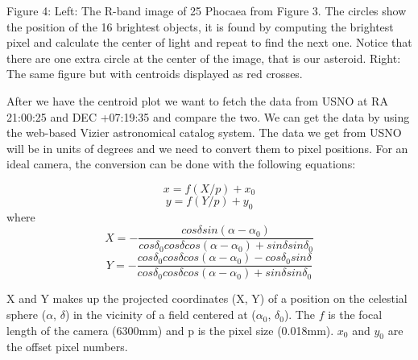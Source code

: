 \documentclass[onecolumn, 12pt, a4paper]{article}
\begin{document}
\newline

Figure 4: Left: The R-band image of 25 Phocaea from Figure 3. The circles show the position of the 16 brightest objects, it is found by computing the brightest pixel and calculate the center of light and repeat to find the next one. Notice that there are one extra circle at the center of the image, that is our asteroid. Right: The same figure but with centroids displayed as red crosses.
\newline
 
After we have the centroid plot we want to fetch the data from USNO at RA 21:00:25 and DEC +07:19:35 and compare the two. We can get the data by using the web-based Vizier astronomical catalog system. The data we get from USNO will be in units of degrees and we need to convert them to pixel positions. For an ideal camera, the conversion can be done with the following equations:\newline

\begin{equation}\label{eq:2}
x = f(X/p)+x_0 
\end{equation}
\begin{equation}
y = f(Y/p)+y_0
\end{equation}
where 
\begin{equation}\label{eq:4}
X = - \dfrac{cos\delta sin(\alpha - \alpha_0)}{cos\delta_0 cos\delta cos(\alpha - \alpha_0) + sin\delta sin\delta_0}
\end{equation}
\begin{equation}\label{eq:4}
Y = - \dfrac{cos\delta_0 cos\delta cos(\alpha - \alpha_0)-cos\delta_0 sin\delta}{cos\delta_0 cos\delta cos(\alpha - \alpha_0) + sin\delta sin\delta_0}
\end{equation}\label{eq:5}
\newline

X and Y makes up the projected coordinates (X, Y) of a position on the celestial sphere ($\alpha$, $\delta$) in the vicinity of a field centered at ($\alpha_0$, $\delta_0$). The $f$ is the focal length of the camera (6300mm) and p is the pixel size (0.018mm). $x_0$ and $y_0$ are the offset pixel numbers.
\newline
\end{document}
